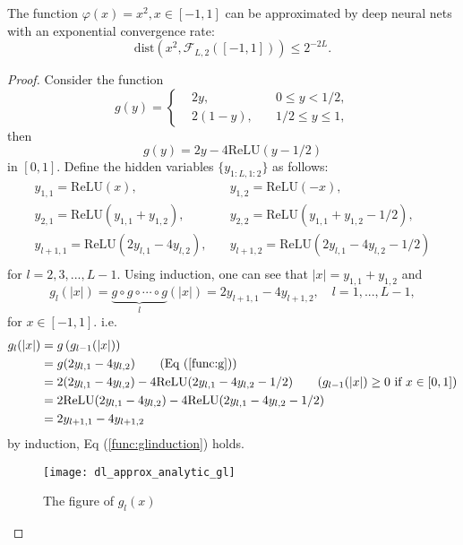 \begin{lemma}\label{lem:xsquare}
The function $\varphi(x) = x^2,x\in [-1,1]$ can be approximated by deep neural nets with an exponential convergence rate:
$$
\mbox{dist}(x^2,\mathcal{F}_{L,2}([-1,1]))\le 2^{-2L}.
$$
\end{lemma}
\begin{proof}
Consider the function
$$
g(y) = \left\{\begin{split}
	&2y,&\quad 0\le y<1/2,\\
	&2(1-y),&\quad 1/2\le y\le 1,
	\end{split}\right.
$$
then 
\begin{equation}\label{func:g}
g(y) = 2y -4\mbox{ReLU}(y-1/2)
\end{equation}
in $[0,1]$. Define the hidden variables $\{y_{1:L,1:2}\}$ as follows:
\[
\begin{split}
 y_{1,1} = \mbox{ReLU}(x),&\quad y_{1,2}=\mbox{ReLU}(-x),\\
 y_{2,1} = \mbox{ReLU}(y_{1,1}+y_{1,2}),&\quad y_{2,2} = \mbox{ReLU}(y_{1,1}+y_{1,2}-1/2),\\
 y_{l+1,1} = \mbox{ReLU}(2y_{l,1}-4y_{l,2}),&\quad y_{l+1,2} = \mbox{ReLU}(2y_{l,1}-4y_{l,2}-1/2)\\
\end{split}
\]
for $l = 2,3,...,L-1$. Using induction, one can see that $|x| = y_{1,1}+y_{1,2}$ and 
\begin{equation}\label{func:glinduction}
g_l(|x|)=\underbrace{g\circ g\circ \cdots \circ g}_{l}(|x|) = 2y_{l+1,1}-4y_{l+1,2},\quad l=1,...,L-1,
\end{equation} 
for $x\in [-1,1]$. i.e.
\[
\begin{split}
g_l(|x|) &= g\left(g_{l-1}(|x|)\right)\\
         &= g(2y_{l,1}-4y_{l,2})\qquad (\mbox{Eq~(\ref{func:g})})\\
         &= 2(2y_{l,1}-4y_{l,2}) - 4\mbox{ReLU}(2y_{l,1}-4y_{l,2}-1/2)\qquad (g_{l-1}(|x|)\ge 0~\mbox{if}~x\in[0,1])\\
         &= 2\mbox{ReLU}(2y_{l,1}-4y_{l,2})- 4\mbox{ReLU}(2y_{l,1}-4y_{l,2}-1/2)\\
         & = 2y_{l+1,1} - 4y_{l+1,2}\\
\end{split}
\]
by induction, Eq (\ref{func:glinduction}) holds.
\begin{figure}[h]
	\centering
	\texttt{[image: dl\_approx\_analytic\_gl]}
	\caption{The figure of $g_l(x)$}
	\label{fig:gl}
\end{figure}


\end{proof}
